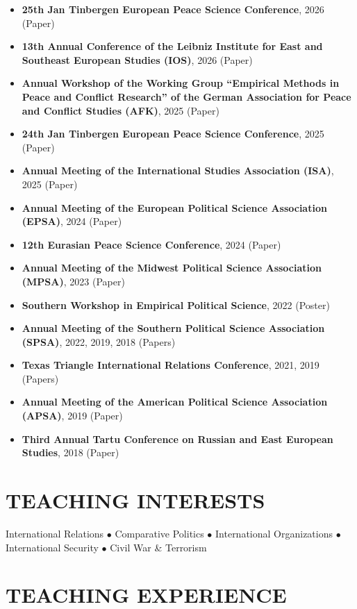 \documentclass[11pt,a4paper,roman]{moderncv}
\begin{document}
\begin{itemize}
  \item \textbf{25th Jan Tinbergen European Peace Science Conference}, 2026 (Paper)
  \item \textbf{13th Annual Conference of the Leibniz Institute for East and Southeast European Studies (IOS)}, 2026 (Paper)
  \item \textbf{Annual Workshop of the Working Group ``Empirical Methods in Peace and Conflict Research'' of the German Association for Peace and Conflict Studies (AFK)}, 2025 (Paper)
  \item \textbf{24th Jan Tinbergen European Peace Science Conference}, 2025 (Paper)
  \item \textbf{Annual Meeting of the International Studies Association (ISA)}, 2025 (Paper)
  \item \textbf{Annual Meeting of the European Political Science Association (EPSA)}, 2024 (Paper)
  \item \textbf{12th Eurasian Peace Science Conference}, 2024 (Paper)
  \item \textbf{Annual Meeting of the Midwest Political Science Association (MPSA)}, 2023 (Paper)
  \item \textbf{Southern Workshop in Empirical Political Science}, 2022 (Poster)
  \item \textbf{Annual Meeting of the Southern Political Science Association (SPSA)}, 2022, 2019, 2018 (Papers)
  \item \textbf{Texas Triangle International Relations Conference}, 2021, 2019 (Papers)
  \item \textbf{Annual Meeting of the American Political Science Association (APSA)}, 2019 (Paper)
  \item \textbf{Third Annual Tartu Conference on Russian and East European Studies}, 2018 (Paper)
\end{itemize}

\section{TEACHING INTERESTS}

International Relations $\bullet$ Comparative Politics $\bullet$ International Organizations $\bullet$ International Security $\bullet$ Civil War \& Terrorism

\section{TEACHING EXPERIENCE}
\end{document}
